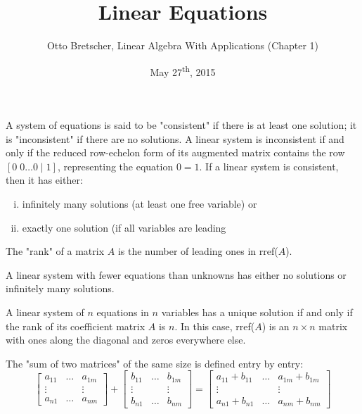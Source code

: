 \documentclass[a4paper,11pt]{article}
\title{Linear Equations}
\author{Otto Bretscher, Linear Algebra With Applications (Chapter 1)}
\date{May 27\textsuperscript{th}, 2015}
\begin{document}
\maketitle
{}

\begin{outline}

    A system of equations is said to be "consistent" if there is at least one solution; it is "inconsistent" 
    if there are no solutions. A linear system is inconsistent if and only if the reduced row-echelon form
    of its augmented matrix contains the row \([0\; 0 \ldots 0\; \vert\; 1]\), representing the equation \(0 = 1\). 
    If a linear system is consistent, then it has either:
    \begin{enumerate}[i.]
      \item infinitely many solutions (at least one free variable) or
      \item exactly one solution (if all variables are leading
    \end{enumerate}
    
    The "rank" of a matrix \(A\) is the number of leading ones in rref(\(A\)).
    
    A linear system with fewer equations than unknowns has either no solutions or infinitely many solutions.

    A linear system of \(n\) equations in \(n\) variables has a unique solution if and only if the rank of its 
    coefficient matrix \(A\) is \(n\). In this case, rref(\(A\)) is an \(n \times n\) matrix with ones along the 
    diagonal and zeros everywhere else.
      
    The "sum of two matrices" of the same size is defined entry by entry:
    \[
      \begin{bmatrix} a_{11} & \ldots & a_{1m} \\ \vdots & & \vdots \\ a_{n1} & \ldots & a_{nm} \end{bmatrix} +
      \begin{bmatrix} b_{11} & \ldots & b_{1m} \\ \vdots & & \vdots \\ b_{n1} & \ldots & b_{nm} \end{bmatrix} =
      \begin{bmatrix}
        a_{11} + b_{11} & \ldots & a_{1m} + b_{1m} \\
        \vdots          &        & \vdots          \\
        a_{n1} + b_{n1} & \ldots & a_{nm} + b_{nm} 
      \end{bmatrix}
    \]
      

\end{outline}
\end{document}

